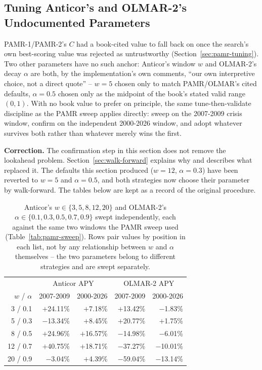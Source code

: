 \documentclass[11pt]{article}
\begin{document}
\subsection{Tuning Anticor's and OLMAR-2's Undocumented Parameters}
\label{sec:anticor-olmar2-tuning}

PAMR-1/PAMR-2's $C$ had a book-cited value to fall back on once the
search's own best-scoring value was rejected as untrustworthy
(Section~\ref{sec:pamr-tuning}). Two other parameters have no such
anchor: Anticor's window $w$ and OLMAR-2's decay $\alpha$ are both,
by the implementation's own comments, ``our own interpretive choice,
not a direct quote'' -- $w=5$ chosen only to match PAMR/OLMAR's cited
defaults, $\alpha=0.5$ chosen only as the midpoint of the book's stated
valid range $(0,1)$. With no book value to prefer on principle, the
same tune-then-validate discipline as the PAMR sweep applies directly:
sweep on the 2007-2009 crisis window, confirm on the independent
2000-2026 window, and adopt whatever survives both rather than
whatever merely wins the first.

\textbf{Correction.} The confirmation step in this section does not remove
the lookahead problem. Section~\ref{sec:walk-forward} explains why and
describes what replaced it. The defaults this section produced ($w=12$,
$\alpha=0.3$) have been reverted to $w=5$ and $\alpha=0.5$, and both
strategies now choose their parameter by walk-forward. The tables below are
kept as a record of the original procedure.

\begin{table}[h]
\centering
\begin{tabular}{rrrrr}
\toprule
& \multicolumn{2}{c}{Anticor APY} & \multicolumn{2}{c}{OLMAR-2 APY} \\
$w$ / $\alpha$ & 2007-2009 & 2000-2026 & 2007-2009 & 2000-2026 \\
\midrule
3 / 0.1   & $+$24.11\% & $+$7.18\%  & $+$13.42\% & $-$1.83\% \\
5 / 0.3   & $-$13.34\% & $+$8.45\%  & $+$20.77\% & $+$1.75\% \\
8 / 0.5   & $+$24.96\% & $+$16.57\% & $-$14.98\% & $-$6.01\% \\
12 / 0.7  & $+$40.75\% & $+$18.71\% & $-$37.27\% & $-$10.01\% \\
20 / 0.9  & $-$3.04\%  & $+$4.39\%  & $-$59.04\% & $-$13.14\% \\
\bottomrule
\end{tabular}
\caption{Anticor's $w \in \{3,5,8,12,20\}$ and OLMAR-2's $\alpha \in
\{0.1,0.3,0.5,0.7,0.9\}$ swept independently, each against the same two
windows the PAMR sweep used (Table~\ref{tab:pamr-sweep}). Rows pair
values by position in each list, not by any relationship between $w$
and $\alpha$ themselves -- the two parameters belong to different
strategies and are swept separately.}
\label{tab:anticor-olmar2-sweep}
\end{table}
\end{document}
